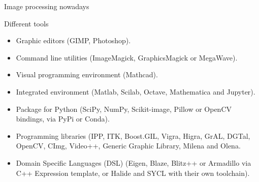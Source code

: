 \documentclass[12pt,aspectratio=169]{beamer}
\begin{document}
\begin{frame}[fragile]{Image processing nowadays}
  \begin{alertblock}{Different tools}
    \begin{itemize}
      \item Graphic editors (GIMP, Photoshop).
      \item Command line utilities (ImageMagick, GraphicsMagick or MegaWave).
      \item Visual programming environment (Mathcad).
      \item Integrated environment (Matlab, Scilab, Octave, Mathematica and Jupyter).
      \item Package for Python (SciPy, NumPy, Scikit-image, Pillow or OpenCV bindings, via PyPi or Conda).
      \item Programming libraries (IPP, ITK, Boost.GIL, Vigra, Higra, GrAL, DGTal, OpenCV, CImg, Video++, Generic Graphic
            Library, Milena and Olena.
      \item Domain Specific Languages (DSL) (Eigen, Blaze, Blitz++ or Armadillo via C++ Expression template, or Halide
            and SYCL with their own toolchain).
    \end{itemize}
  \end{alertblock}
\end{frame}
\end{document}
